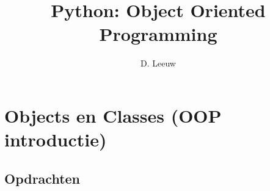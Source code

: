 \documentclass[a4paper,12pt,twoside,titlepage]{article}
\author{D. Leeuw}
\title{Python: Object Oriented Programming}
\date{\today\\
0.0.0
\vfill
\raggedright
\copyright\ 2025 Dennis Leeuw\\
}
\begin{document}

\maketitle



\section{Objects en Classes (OOP introductie)}

\subsection{Opdrachten}


\printindex
\end{document}
